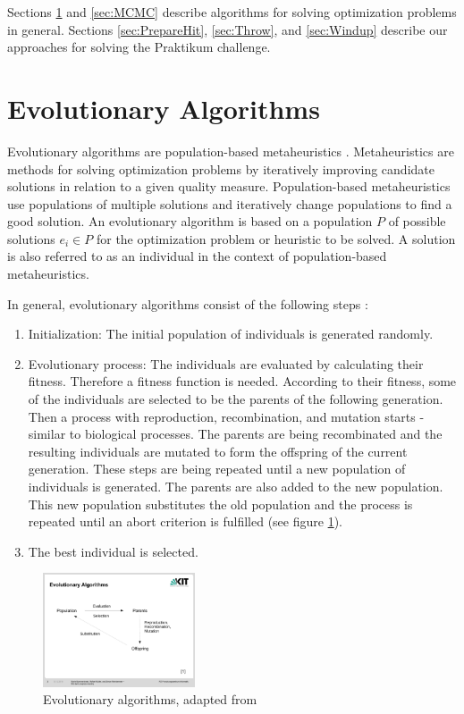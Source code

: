 \documentclass[10pt,twocolumn,letterpaper]{article}
\begin{document}
Sections \ref{sec:EA} and \ref{sec:MCMC} describe algorithms for solving optimization problems in general. Sections \ref{sec:PrepareHit}, \ref{sec:Throw}, and \ref{sec:Windup} describe our approaches for solving the Praktikum challenge.


\section{Evolutionary Algorithms} \label{sec:EA}

Evolutionary algorithms are population-based metaheuristics \cite{EA}. Metaheuristics are methods for solving optimization problems by iteratively improving candidate solutions in relation to a given quality measure.
Population-based metaheuristics use populations of multiple solutions and iteratively change populations to find a good solution.
An evolutionary algorithm is based on a population $P$ of possible solutions $e_i \in P$ for the optimization problem or heuristic to be solved. A solution is also referred to as an individual in the context of population-based metaheuristics.

In general, evolutionary algorithms consist of the following steps \cite{EA}:

\begin{enumerate}
\item Initialization: The initial population of individuals is generated randomly.

\item Evolutionary process: The individuals are evaluated by calculating their fitness. Therefore a fitness function is needed.
According to their fitness, some of the individuals are selected to be the parents of the following generation.
Then a process with reproduction, recombination, and mutation starts - similar to biological processes.
The parents are being recombinated and the resulting individuals are mutated to form the offspring of the current generation.
These steps are being repeated until a new population of individuals is generated. The parents are also added to the new population. This new population substitutes the old population and the process is repeated until an abort criterion is fulfilled  (see figure \ref{fig:EA}).

\item The best individual is selected.
\end{enumerate}


\begin{figure}
	\begin{center}
		\includegraphics[trim = 2.2cm 6cm 4.1cm 6cm, clip, width=0.4\textwidth]{EA}
	\end{center}
	\caption{Evolutionary algorithms, adapted from \cite{EA}}
	\label{fig:EA}
\end{figure}
\end{document}
